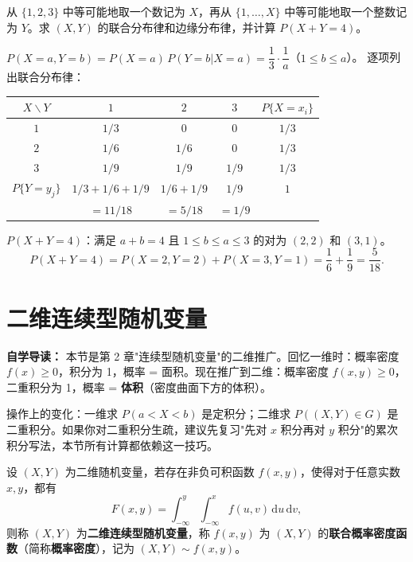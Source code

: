 ﻿\documentclass[lang=cn,11pt]{elegantbook}
\begin{document}
\begin{exercise}[离散条件均匀分布] \label{exer:3-d5}
从 $\{1,2,3\}$ 中等可能地取一个数记为 $X$，再从 $\{1,\dots,X\}$ 中等可能地取一个整数记为 $Y$。求 $(X,Y)$ 的联合分布律和边缘分布律，并计算 $P(X+Y=4)$。
\end{exercise}
\begin{solution}
$P(X=a,Y=b) = P(X=a)\,P(Y=b|X=a) = \dfrac{1}{3}\cdot\dfrac{1}{a}$（$1 \leqslant b \leqslant a$）。
逐项列出联合分布律：
\begin{center}
\begin{tabular}{c|ccc|c}
\toprule
$X \backslash Y$ & $1$ & $2$ & $3$ & $P\{X=x_i\}$ \\
\midrule
$1$ & $1/3$ & $0$ & $0$ & $1/3$ \\[4pt]
$2$ & $1/6$ & $1/6$ & $0$ & $1/3$ \\[4pt]
$3$ & $1/9$ & $1/9$ & $1/9$ & $1/3$ \\
\midrule
$P\{Y=y_j\}$ & $1/3+1/6+1/9$ & $1/6+1/9$ & $1/9$ & $1$ \\
& $= 11/18$ & $= 5/18$ & $= 1/9$ & \\
\bottomrule
\end{tabular}
\end{center}
$P(X+Y=4)$：满足 $a+b=4$ 且 $1\leqslant b\leqslant a\leqslant 3$ 的对为 $(2,2)$ 和 $(3,1)$。
\[
P(X+Y=4) = P(X=2,Y=2)+P(X=3,Y=1) = \frac{1}{6}+\frac{1}{9} = \frac{5}{18}.
\]
\end{solution}


\section{二维连续型随机变量}

\begin{note}
\textbf{自学导读：} 本节是第 2 章"连续型随机变量"的二维推广。回忆一维时：概率密度 $f(x)\geqslant 0$，积分为 1，概率 = 面积。现在推广到二维：概率密度 $f(x,y)\geqslant 0$，二重积分为 1，概率 = \textbf{体积}（密度曲面下方的体积）。

操作上的变化：一维求 $P(a<X<b)$ 是定积分；二维求 $P((X,Y)\in G)$ 是二重积分。如果你对二重积分生疏，建议先复习"先对 $x$ 积分再对 $y$ 积分"的累次积分写法，本节所有计算都依赖这一技巧。
\end{note}

\begin{definition}[二维连续型随机变量] \label{def:2d-continuous}
设 $(X,Y)$ 为二维随机变量，若存在非负可积函数 $f(x,y)$，使得对于任意实数 $x,y$，都有
\[
F(x,y) = \int_{-\infty}^{y}\int_{-\infty}^{x}f(u,v)\,\mathrm{d}u\,\mathrm{d}v,
\]
则称 $(X,Y)$ 为\textbf{二维连续型随机变量}，称 $f(x,y)$ 为 $(X,Y)$ 的\textbf{联合概率密度函数}（简称\textbf{概率密度}），记为 $(X,Y) \sim f(x,y)$。
\end{definition}
\end{document}
